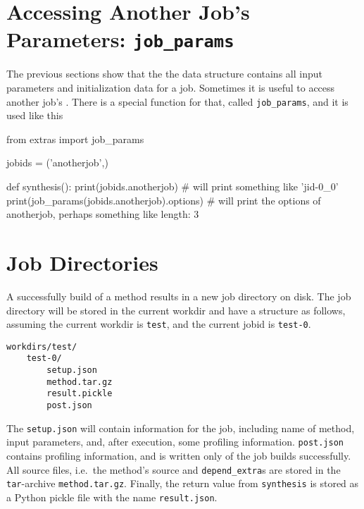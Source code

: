 \stoptabletwo



\section{Accessing Another Job's Parameters:  \texttt{job\_params}}

The previous sections show that the the \params data structure
contains all input parameters and initialization data for a job.
Sometimes it is useful to access another job's \params.  There is a
special function for that, called \texttt{job\_params}, and it is used
like this
\begin{python}
from extras import job_params

jobids = ('anotherjob',)

def synthesis():
    print(jobids.anotherjob)
    # will print something like 'jid-0_0'
    print(job_params(jobids.anotherjob).options)
    # will print the options of anotherjob, perhaps something like {length: 3}
\end{python}






\section{Job Directories}
A successfully build of a method results in a new job directory on
disk.  The job directory will be stored in the current workdir and
have a structure as follows, assuming the current workdir
is \texttt{test}, and the current jobid is \texttt{test-0}.
\begin{verbatim}
workdirs/test/
    test-0/
        setup.json
        method.tar.gz
        result.pickle
        post.json
\end{verbatim}
The \texttt{setup.json} will contain information for the job,
including name of method, input parameters, and, after execution, some
profiling information.  \texttt{post.json} contains profiling
information, and is written only of the job builds successfully.  All
source files, i.e.\ the method's source and \texttt{depend\_extra}s
are stored in the \texttt{tar}-archive \texttt{method.tar.gz}.
Finally, the return value from \texttt{synthesis} is stored as a
Python pickle file with the name \texttt{result.json}.

